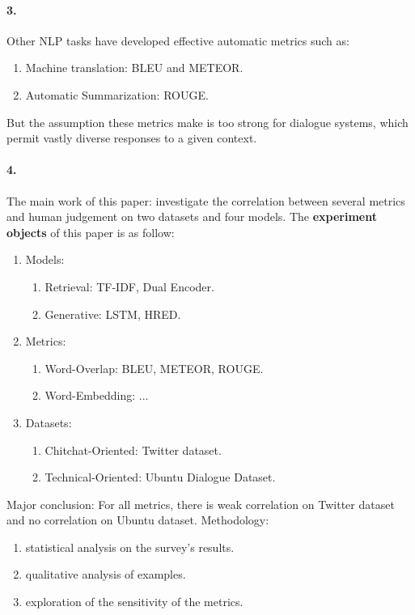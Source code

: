 \documentclass[runningheads]{llncs}
\begin{document}
\paragraph{3. } Other NLP tasks have developed effective automatic metrics such as:
\begin{enumerate}
    \item Machine translation: BLEU and METEOR.
    \item Automatic Summarization: ROUGE.
\end{enumerate}
But the assumption these metrics make is too strong for dialogue systems, which
permit vastly diverse responses to a given context.

\paragraph{4. } The main work of this paper: investigate the correlation
between several metrics and human judgement on two datasets and four models.
The \textbf{experiment objects} of this paper is as follow:
\begin{enumerate}
    \item Models:
    \begin{enumerate}
          \item Retrieval: TF-IDF, Dual Encoder.
        \item Generative: LSTM, HRED.
    \end{enumerate}
    \item Metrics:
    \begin{enumerate}
        \item Word-Overlap: BLEU, METEOR, ROUGE.
        \item Word-Embedding: ...
    \end{enumerate}
    \item Datasets:
    \begin{enumerate}
        \item Chitchat-Oriented: Twitter dataset.
        \item Technical-Oriented: Ubuntu Dialogue Dataset.
    \end{enumerate}
\end{enumerate}

Major conclusion:
For all metrics, there is weak correlation on Twitter dataset and no correlation
on Ubuntu dataset.
Methodology:
\begin{enumerate}
    \item statistical analysis on the survey's results.
    \item qualitative analysis of examples.
    \item exploration of the sensitivity of the metrics.
\end{enumerate}
\end{document}
